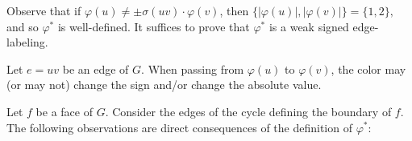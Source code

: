 \documentclass[12pt]{article}
\begin{document}
	
Observe that if $\varphi(u) \ne \pm \sigma(uv)\cdot \varphi(v)$, then $\{|\varphi(u)|,|\varphi(v)|\}=\{1,2\},$ and so  $\varphi^*$ is well-defined. It suffices to prove that $\varphi^*$ is a weak signed edge-labeling.
	

Let $e=uv$ be an edge of $G$. When passing from $\varphi(u)$ to $\varphi(v)$, the color may (or may not) change the sign and/or change the absolute value. 

Let $f$  be a face of $G$. Consider the edges of the cycle defining the boundary of $f$.
The following observations are direct consequences of the definition of $\varphi^*$:
\end{document}
